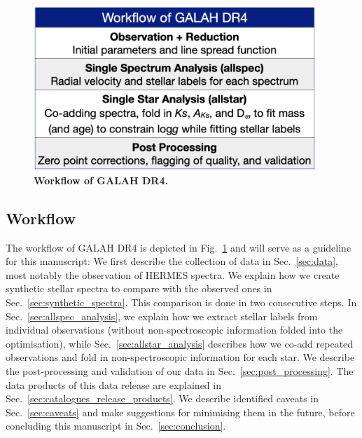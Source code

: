 \documentclass[
  journal=pasa,
  manuscript=research-paper, %
  year=2024,
  volume=37
]{cup-journal}
\begin{document}
\begin{figure}[ht]
 \centering
 \includegraphics[width=0.95\textwidth]{figures/workflow_galah_dr4.png}
 \caption{\textbf{Workflow of GALAH DR4.}}
 \label{fig:workflow_galah_dr4}
\end{figure}

\subsection{Workflow} \label{sec:workflow}

The workflow of GALAH DR4 is depicted in Fig.~\ref{fig:workflow_galah_dr4} and will serve as a guideline for this manuscript: We first describe the collection of data in Sec.~\ref{sec:data}, most notably the observation of HERMES spectra. We explain how we create synthetic stellar spectra to compare with the observed ones in Sec.~\ref{sec:synthetic_spectra}. This comparison is done in two consecutive steps. In Sec.~\ref{sec:allspec_analysis}, we explain how we extract stellar labels from individual observations (without non-spectroscopic information folded into the optimisation), while Sec.~\ref{sec:allstar_analysis} describes how we co-add repeated observations and fold in non-spectroscopic information for each star. We describe the post-processing and validation of our data in Sec.~\ref{sec:post_processing}. The data products of this data release are explained in Sec.~\ref{sec:catalogues_release_products}. We describe identified caveats in Sec.~\ref{sec:caveats} and make suggestions for minimising them in the future, before concluding this manuscript in Sec.~\ref{sec:conclusion}.
\end{document}
